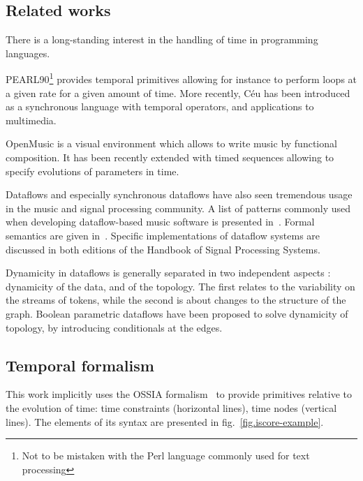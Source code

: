 \documentclass{article}
\begin{document}
\subsection{Related works}
There is a long-standing interest in the handling of time in programming languages.

PEARL90\cite{halang2001safe}\footnote{Not to be mistaken with the Perl language commonly used for text processing} provides temporal primitives allowing for instance to perform loops at a given rate for a given amount of time.
More recently, Céu has been introduced as a synchronous language with temporal operators, and applications to multimedia\cite{Santos:2016:CLI:2976796.2976856}.

OpenMusic is a visual environment which allows to write music by functional composition.
It has been recently extended with timed sequences allowing to specify evolutions of parameters in time\cite{garcia:hal-01484077}.

Dataflows and especially synchronous dataflows have also seen tremendous usage in the music and signal processing community. 
A list of patterns commonly used when developing dataflow-based music software is presented in~\cite{arumi2006dataflow}.
Formal semantics are given in~\cite{benveniste_data-flow_1993}.
Specific implementations of dataflow systems are discussed in both editions of the Handbook of Signal Processing Systems\cite{bhattacharyya_handbook_2013}. 

Dynamicity in dataflows is generally separated in two independent aspects : dynamicity of the data, and of the topology.
The first relates to the variability on the streams of tokens, while the second is about changes to the structure of the graph. 
Boolean parametric dataflows\cite{bempelis2015boolean} have been proposed to solve dynamicity of topology, by introducing conditionals at the edges.

\subsection{Temporal formalism}
This work implicitly uses the OSSIA formalism~\cite{celerier2015ossia} to provide primitives relative to the evolution of time: time constraints (horizontal lines), time nodes (vertical lines). 
The elements of its syntax are presented in fig.~\ref{fig.iscore-example}.
    
\end{document}
